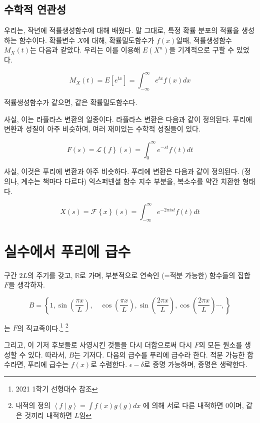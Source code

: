 \documentclass[article, oneside]{oblivoir}
\begin{document}
\subsection{수학적 연관성}

우리는, 작년에 적률생성함수에 대해 배웠다. 말 그대로, 특정 확률 분포의 적률을 생성하는 함수이다. 확률변수 $X$에 대해, 확률밀도함수가 $f(x)$일때, 적률생성함수 $M_X(t)$는 다음과 같았다. 우리는 이를 이용해 $E(X^n)$을 기계적으로 구할 수 있었다.

\begin{equation}
    M_X(t) = E[e^{tx}] = \int_{-\infty}^{\infty} e^{tx} f(x) dx
\end{equation}

적률생성함수가 같으면, 같은 확률밀도함수다.

사실, 이는 라플라스 변환의 일종이다. 라플라스 변환은 다음과 같이 정의된다. 푸리에 변환과 성질이 아주 비슷하며, 여러 재미있는 수학적 성질들이 있다.


\begin{equation}
    F(s) = \mathcal{L}\left\{f\right\}(s) = \int_0^{\infty}e^{-st} f(t) dt
\end{equation}

사실, 이것은 푸리에 변환과 아주 비슷하다. 푸리에 변환은 다음과 같이 정의된다. (정의나, 계수는 책마다 다르다) 익스퍼넨셜 함수 지수 부분을, 복소수를 약간 치환한 형태다. 

\begin{equation}
    X(s) = \mathcal{F}\left\{x\right\}(s) = \int_{-\infty}^{\infty}e^{-2 \pi i s t} f(t) dt
\end{equation}



\section{실수에서 푸리에 급수}
구간 $2L$의 주기를 갖고, $\mathbb{R}$로 가며, 부분적으로 연속인 (=적분 가능한) 함수들의 집합 $F$을 생각하자.

$$B = \left\{1, \sin \left(\frac{\pi x}{L}\right), \quad \cos \left(\frac{\pi x}{L}\right), \sin \left(\frac{2 \pi x}{L}\right),  \cos \left(\frac{2 \pi x}{L}\right) \cdots, \right\}$$

는 $F$의 직교족이다.\footnote{2021 1학기 선형대수 참조} \footnote{내적의 정의 $\left\langle f\mid g\right\rangle = \int f(x) g(g) dx $ 에 의해 서로 다른 내적하면 0이며, 같은 것끼리 내적하면 $L$임}


그리고, 이 기저 후보들로 사영시킨 것들을 다시 더함으로써 다시 $F$의 모든 원소를 생성할 수 있다. 따라서, $B$는 기저다. 다음의 급수를 푸리에 급수라 한다. 적분 가능한 함수라면, 푸리에 급수는 $f(x)$로 수렴한다. $\epsilon-\delta$로 증명 가능하며, 증명은 생략한다.
\end{document}
